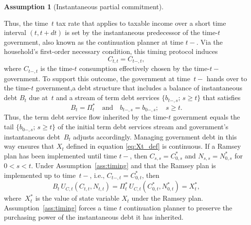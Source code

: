 \documentclass[12pt]{article}
\newtheorem{assumption}{Assumption}
\begin{document}
{\begin{assumption}[Instantaneous partial commitment]
\end{assumption}

\noindent Thus,  the time~$t$ tax rate  that applies to taxable income  over a short time interval $(t, t+dt)$ is set by the instantaneous predecessor of the time-$t$ government, also known as the continuation  planner at time $t-$. Via  the household's first-order necessary condition, this timing protocol induces
\begin{equation}\label{eq:Ctt}
C_{t,t} = C_{t-,t},
\end{equation}
where $C_{t-,t}$ is the time-$t$ consumption effectively chosen by the time-$t-$ government.
To support this outcome,  the government at time~$t-$ hands over  to the time-$t$ government,a debt structure that includes a balance of instantaneous debt  $B_t$ due at~$t$  and a stream of term debt services $\{b_{t-,s};\, s \ge t\}$  that satisfies
\begin{equation}\label{eq:implement_strategy}
B_t = \Pi_t^* \quad \text{and} \quad b_{t-,s} = b_{0-,s};\quad s \ge t.
\end{equation}
Thus, the term debt service flow inherited by the time-$t$ government equals  the tail  $\{b_{0-,s};\, s \ge t\}$ of the initial term debt services stream
and %
government's instantaneous debt~$B_t$ adjusts accordingly.
%
%
Managing government debt in this way 
ensures that $X_t$ defined  in equation \eqref{eq:Xt_def} is continuous.
If a Ramsey plan has been implemented until time $t - $, then $C_{s,s} = C_{0,s}^*$ and $N_{s,s} = N_{0,s}^*$ for $0 < s < t$. 
Under Assumption~\ref{ass:timing} and that the Ramsey plan is implemented up to time~$t-$, i.e., 
$C_{t-,t} = C_{0,t}^*$, then
\begin{equation}\label{eq:Xt_implement}
B_t\, U_{C,t}(C_{t,t}, N_{t,t}) = \Pi_t^*\, U_{C,t}(C_{0,t}^*, N_{0,t}^*) = X_t^*,
\end{equation}
where~$X_t^*$ is the value of  state variable $X_t$ under the Ramsey plan. Assumption~\ref{ass:timing} forces a time $t$ continuation planner to preserve the purchasing power of the instantaneous debt it has  inherited. %

}
\end{document}
